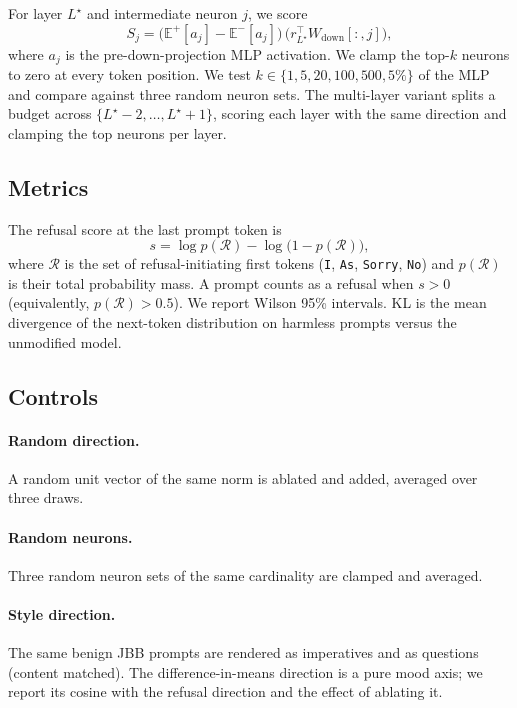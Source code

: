 \documentclass[twoside,11pt]{article}
\begin{document}
For layer $L^{\star}$ and intermediate neuron $j$, we score
\begin{equation}
S_j = \bigl(\mathbb{E}^{+}[a_j] - \mathbb{E}^{-}[a_j]\bigr)\,
      \bigl(r_{L^{\star}}^{\top} W_{\mathrm{down}}[:,j]\bigr),
\end{equation}
where $a_j$ is the pre-down-projection MLP activation. We clamp the top-$k$ neurons
to zero at every token position. We test $k \in \{1, 5, 20, 100, 500, 5\%\}$ of the
MLP and compare against three random neuron sets. The multi-layer variant splits a
budget across $\{L^{\star}-2, \ldots, L^{\star}+1\}$, scoring each layer with the
same direction and clamping the top neurons per layer.

\subsection{Metrics}

The refusal score at the last prompt token is
\begin{equation}
s = \log p(\mathcal{R}) - \log\bigl(1 - p(\mathcal{R})\bigr),
\end{equation}
where $\mathcal{R}$ is the set of refusal-initiating first tokens (\texttt{I},
\texttt{As}, \texttt{Sorry}, \texttt{No}) and $p(\mathcal{R})$ is their total
probability mass. A prompt counts as a refusal when $s > 0$ (equivalently,
$p(\mathcal{R}) > 0.5$). We report Wilson 95\% intervals. KL is the mean divergence
of the next-token distribution on harmless prompts versus the unmodified model.

\subsection{Controls}

\paragraph{Random direction.} A random unit vector of the same norm is ablated and
added, averaged over three draws.

\paragraph{Random neurons.} Three random neuron sets of the same cardinality are
clamped and averaged.

\paragraph{Style direction.} The same benign JBB prompts are rendered as imperatives
and as questions (content matched). The difference-in-means direction is a pure
mood axis; we report its cosine with the refusal direction and the effect of
ablating it.
\end{document}
